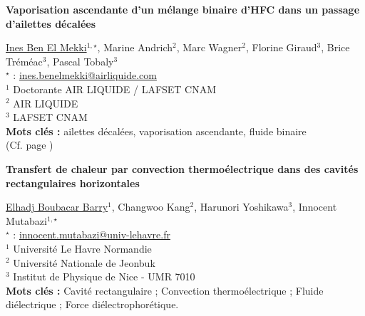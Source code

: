 %
\begin{flushleft}
\addtocounter{section}{1}
{\Large \textbf{Vaporisation ascendante d'un mélange binaire d'HFC dans un passage d'ailettes décalées}}\label{ref:12}
\end{flushleft}
%
\underline{Ines Ben El Mekki}$^{1,\star}$, Marine Andrich$^{2}$, Marc Wagner$^{2}$, Florine Giraud$^{3}$, Brice Tréméac$^{3}$, Pascal Tobaly$^{3}$\\[2mm]
$^{\star}$ \Letter : \url{ines.benelmekki@airliquide.com}\\[2mm]
{\footnotesize $^{1}$ Doctorante AIR LIQUIDE / LAFSET CNAM}\\
{\footnotesize $^{2}$ AIR LIQUIDE}\\
{\footnotesize $^{3}$ LAFSET CNAM}\\
[4mm]
%
\noindent \textbf{Mots clés : } ailettes décalées, vaporisation ascendante, fluide binaire\\[4mm]


\noindent(Cf. page  \pageref{ref:12})

\clearpage

%
\begin{flushleft}
\addtocounter{section}{1}
{\Large \textbf{Transfert de chaleur par convection thermoélectrique dans des cavités rectangulaires horizontales}}\label{ref:31}
\end{flushleft}
%
\underline{Elhadj Boubacar Barry}$^{1}$, Changwoo Kang$^{2}$, Harunori Yoshikawa$^{3}$, Innocent Mutabazi$^{1,\star}$\\[2mm]
$^{\star}$ \Letter : \url{innocent.mutabazi@univ-lehavre.fr}\\[2mm]
{\footnotesize $^{1}$ Université Le Havre Normandie}\\
{\footnotesize $^{2}$ Université Nationale de Jeonbuk}\\
{\footnotesize $^{3}$ Institut de Physique de Nice - UMR 7010}\\
[4mm]
%
\noindent \textbf{Mots clés : } Cavité rectangulaire ; Convection thermoélectrique ; Fluide diélectrique ; Force diélectrophorétique.\\[4mm]
%


